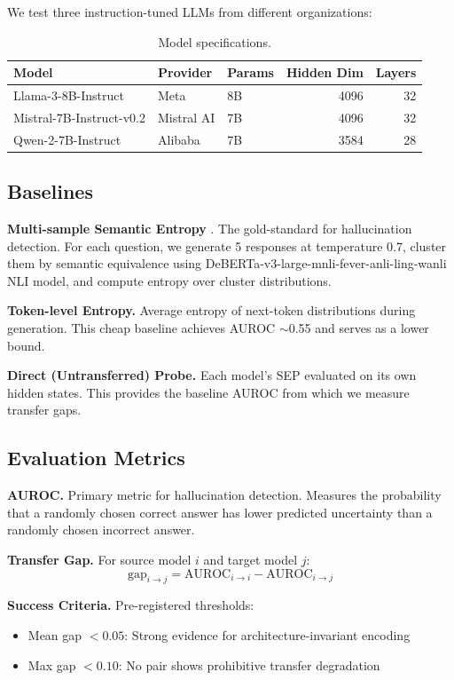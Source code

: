 We test three instruction-tuned LLMs from different organizations:

\begin{table}[h]
\centering
\caption{Model specifications.}
\label{tab:models}
\begin{tabular}{@{}lllrr@{}}
\toprule
Model & Provider & Params & Hidden Dim & Layers \\
\midrule
Llama-3-8B-Instruct & Meta & 8B & 4096 & 32 \\
Mistral-7B-Instruct-v0.2 & Mistral AI & 7B & 4096 & 32 \\
Qwen-2-7B-Instruct & Alibaba & 7B & 3584 & 28 \\
\bottomrule
\end{tabular}
\end{table}

\subsection{Baselines}

\textbf{Multi-sample Semantic Entropy} \citep{farquhar2024detecting}. The gold-standard for hallucination detection. For each question, we generate 5 responses at temperature 0.7, cluster them by semantic equivalence using DeBERTa-v3-large-mnli-fever-anli-ling-wanli NLI model, and compute entropy over cluster distributions.

\textbf{Token-level Entropy.} Average entropy of next-token distributions during generation. This cheap baseline achieves AUROC $\sim$0.55 and serves as a lower bound.

\textbf{Direct (Untransferred) Probe.} Each model's SEP evaluated on its own hidden states. This provides the baseline AUROC from which we measure transfer gaps.

\subsection{Evaluation Metrics}

\textbf{AUROC.} Primary metric for hallucination detection. Measures the probability that a randomly chosen correct answer has lower predicted uncertainty than a randomly chosen incorrect answer.

\textbf{Transfer Gap.} For source model $i$ and target model $j$:
\begin{equation}
\text{gap}_{i \to j} = \text{AUROC}_{i \to i} - \text{AUROC}_{i \to j}
\end{equation}

\textbf{Success Criteria.} Pre-registered thresholds:
\begin{itemize}
\item Mean gap $< 0.05$: Strong evidence for architecture-invariant encoding
\item Max gap $< 0.10$: No pair shows prohibitive transfer degradation
\end{itemize}
